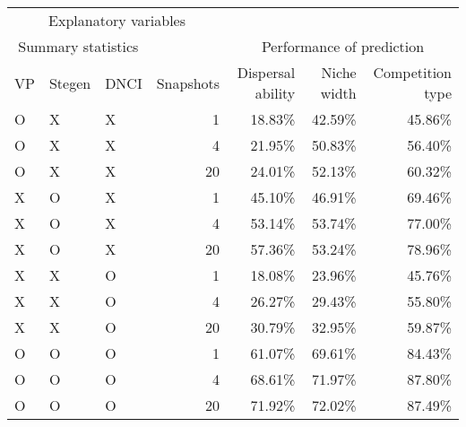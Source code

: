 \begin{longtable}{lllrrrr}
\toprule
\multicolumn{4}{c}{Explanatory variables} &  &  &  \\ 
\cmidrule(lr){1-4}
\multicolumn{3}{c}{Summary statistics} &  & \multicolumn{3}{c}{Performance of prediction} \\ 
\cmidrule(lr){1-3} \cmidrule(lr){5-7}
VP & Stegen & DNCI & Snapshots & Dispersal ability & Niche width & Competition type \\ 
\midrule
O & X & X & 1 & 18.83\% & 42.59\% & 45.86\% \\ 
O & X & X & 4 & 21.95\% & 50.83\% & 56.40\% \\ 
O & X & X & 20 & 24.01\% & 52.13\% & 60.32\% \\ 
X & O & X & 1 & 45.10\% & 46.91\% & 69.46\% \\ 
X & O & X & 4 & 53.14\% & 53.74\% & 77.00\% \\ 
X & O & X & 20 & 57.36\% & 53.24\% & 78.96\% \\ 
X & X & O & 1 & 18.08\% & 23.96\% & 45.76\% \\ 
X & X & O & 4 & 26.27\% & 29.43\% & 55.80\% \\ 
X & X & O & 20 & 30.79\% & 32.95\% & 59.87\% \\ 
O & O & O & 1 & 61.07\% & 69.61\% & 84.43\% \\ 
O & O & O & 4 & 68.61\% & 71.97\% & 87.80\% \\ 
O & O & O & 20 & 71.92\% & 72.02\% & 87.49\% \\ 
\bottomrule
\end{longtable}

